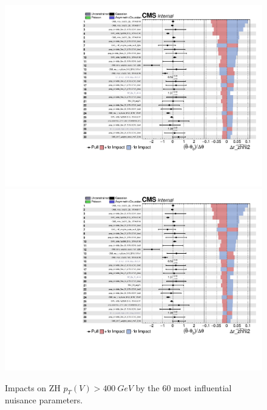 \begin{figure}
  \centering
  \includegraphics[width=0.85\linewidth,page=1]{figures/impacts/impacts_r_zhhi2.pdf}
  \includegraphics[width=0.85\linewidth,page=2]{figures/impacts/impacts_r_zhhi2.pdf}
  \caption[Impacts for ZH $p_T(V) > \SI{400}{GeV}$]{
    Impacts on ZH $p_T(V) > \SI{400}{GeV}$ by the 60 most influential nuisance parameters.
  }
  \label{fig:impacts_r_zhhi2}
\end{figure}

